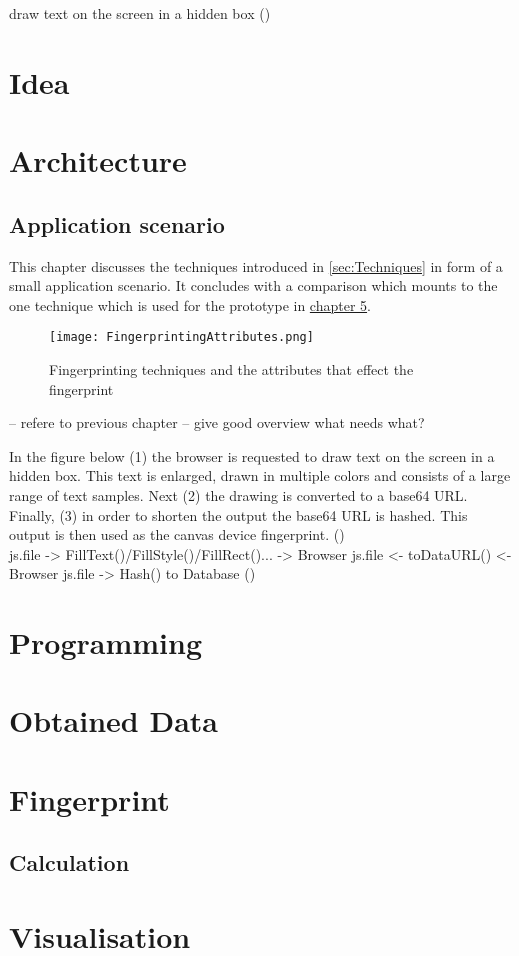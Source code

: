  draw text on the screen in a hidden box
(\textcite{jkula17})\\


\section{Idea}

\section{Architecture}

\subsection{Application scenario}

This chapter discusses the techniques introduced in \autoref{sec:Techniques} in form of a small application scenario. It concludes with a comparison which mounts to the one technique which is used for the prototype in \hyperref[cha:implementation]{chapter 5}.

\begin{figure}[H]
	\centering
	\texttt{[image: FingerprintingAttributes.png]}
	\caption{Fingerprinting techniques and the attributes that effect the fingerprint}
	\label{BrowserSpecification}
\end{figure}

-- refere to previous chapter
-- give good overview what needs what?

In the figure below (1) the browser is requested to draw text on the screen in a hidden box. This text is enlarged, drawn in multiple colors and consists of a large range of text samples. Next (2) the drawing is converted to a base64 URL. Finally, (3) in order to shorten the output the base64 URL is hashed. This output is then used as the canvas device fingerprint. 
(\textcite{jkula17})\\

js.file -> FillText()/FillStyle()/FillRect()... -> Browser
js.file <- toDataURL() <- Browser
js.file -> Hash() to Database
(\textcite{jkula17})

\section{Programming}


\section{Obtained Data}


\section{Fingerprint}

\subsection{Calculation}

\section{Visualisation}